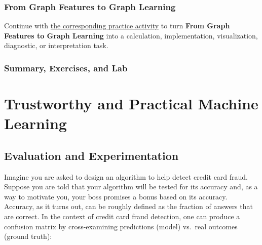 \documentclass[
  letterpaper,
]{scrbook}
\begin{document}
\section{From Graph Features to Graph
Learning}\label{from-graph-features-to-graph-learning}

\begin{tcolorbox}[enhanced jigsaw, arc=.35mm, bottomrule=.15mm, bottomtitle=1mm, breakable, colback=white, colbacktitle=quarto-callout-tip-color!10!white, colframe=quarto-callout-tip-color-frame, coltitle=black, left=2mm, leftrule=.75mm, opacityback=0, opacitybacktitle=0.6, rightrule=.15mm, title=\textcolor{quarto-callout-tip-color}{\faLightbulb}\hspace{0.5em}{Put it into practice}, titlerule=0mm, toprule=.15mm, toptitle=1mm]

Continue with
\hyperref[sec-pr-13-from-graph-features-to-graph-learning]{the
corresponding practice activity} to turn \textbf{From Graph Features to
Graph Learning} into a calculation, implementation, visualization,
diagnostic, or interpretation task.

\end{tcolorbox}

\section{Summary, Exercises, and Lab}\label{summary-exercises-and-lab-2}

\part{Trustworthy and Practical Machine Learning}

\chapter{Evaluation and Experimentation}\label{ch-evaluation}

Imagine you are asked to design an algorithm to help detect credit card
fraud. Suppose you are told that your algorithm will be tested for its
accuracy and, as a way to motivate you, your boss promises a bonus based
on its accuracy. Accuracy, as it turns out, can be roughly defined as
the fraction of answers that are correct. In the context of credit card
fraud detection, one can produce a confusion matrix by cross-examining
predictions (model) vs.~real outcomes (ground truth):
\end{document}
